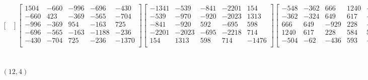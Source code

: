 \documentclass[12pt]{amsart}
\theoremstyle{plain}
\theoremstyle{definition}
\begin{document}
\begin{landscape}
\begin{align*}
\begin{bmatrix}
\end{bmatrix}
\begin{bmatrix}
1504  &   -660  &   -996  &   -696  &   -430  \\ 
 -660  &   423  &   -369  &   -565  &   -704  \\ 
 -996  &   -369  &   954  &   -163  &   725  \\ 
 -696  &   -565  &   -163  &   -1188  &   -236  \\ 
 -430  &   -704  &   725  &   -236  &   -1370  \\ 
\end{bmatrix}
\begin{bmatrix}
-1341  &   -539  &   -841  &   -2201  &   154  \\ 
 -539  &   -970  &   -920  &   -2023  &   1313  \\ 
 -841  &   -920  &   592  &   -695  &   598  \\ 
 -2201  &   -2023  &   -695  &   -2218  &   714  \\ 
 154  &   1313  &   598  &   714  &   -1476  \\ 
\end{bmatrix}
\begin{bmatrix}
-548  &   -362  &   666  &   1240  &   -504  \\ 
 -362  &   -324  &   649  &   617  &   -62  \\ 
 666  &   649  &   -929  &   228  &   -436  \\ 
 1240  &   617  &   228  &   584  &   593  \\ 
 -504  &   -62  &   -436  &   593  &   -961  \\ 
\end{bmatrix}
\\
(12,4) &:
\begin{bmatrix}
3189  &   680  &   1939  &   3187  &   1533  \\ 
 680  &   405  &   -1300  &   355  &   1162  \\ 
 1939  &   -1300  &   2378  &   273  &   612  \\ 
 3187  &   355  &   273  &   3165  &   1409  \\ 
 1533  &   1162  &   612  &   1409  &   1904  \\ 
\end{bmatrix}
\begin{bmatrix}
-3340  &   -3670  &   -2096  &   -3556  &   1547  \\ 
 -3670  &   -4485  &   -4075  &   -4227  &   3674  \\ 
 -2096  &   -4075  &   -1986  &   -2355  &   1810  \\ 

\end{bmatrix}
\end{align*}
\end{landscape}
\end{document}
